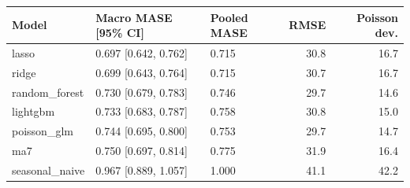\begin{tabular}{lllrr}
\toprule
Model & Macro MASE [95\% CI] & Pooled MASE & RMSE & Poisson dev. \\
\midrule
lasso & 0.697 [0.642, 0.762] & 0.715 & 30.8 & 16.7 \\
ridge & 0.699 [0.643, 0.764] & 0.715 & 30.7 & 16.7 \\
random\_forest & 0.730 [0.679, 0.783] & 0.746 & 29.7 & 14.6 \\
lightgbm & 0.733 [0.683, 0.787] & 0.758 & 30.8 & 15.0 \\
poisson\_glm & 0.744 [0.695, 0.800] & 0.753 & 29.7 & 14.7 \\
ma7 & 0.750 [0.697, 0.814] & 0.775 & 31.9 & 16.4 \\
seasonal\_naive & 0.967 [0.889, 1.057] & 1.000 & 41.1 & 42.2 \\
\bottomrule
\end{tabular}
